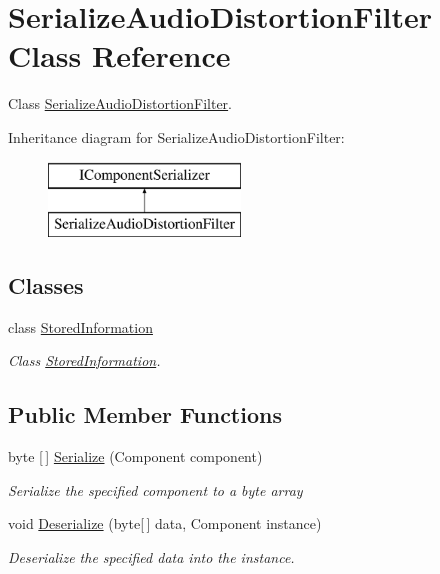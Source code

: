 \hypertarget{class_serialize_audio_distortion_filter}{}\section{Serialize\+Audio\+Distortion\+Filter Class Reference}
\label{class_serialize_audio_distortion_filter}


Class \hyperlink{class_serialize_audio_distortion_filter}{Serialize\+Audio\+Distortion\+Filter}.  


Inheritance diagram for Serialize\+Audio\+Distortion\+Filter\+:\begin{figure}[H]
\begin{center}
\leavevmode
\includegraphics[height=2.000000cm]{class_serialize_audio_distortion_filter}
\end{center}
\end{figure}
\subsection*{Classes}
\begin{DoxyCompactItemize}
\item 
class \hyperlink{class_serialize_audio_distortion_filter_1_1_stored_information}{Stored\+Information}
\begin{DoxyCompactList}\small\item\em Class \hyperlink{class_serialize_audio_distortion_filter_1_1_stored_information}{Stored\+Information}. \end{DoxyCompactList}\end{DoxyCompactItemize}
\subsection*{Public Member Functions}
\begin{DoxyCompactItemize}
\item 
byte \mbox{[}$\,$\mbox{]} \hyperlink{class_serialize_audio_distortion_filter_a035cc0e02b72b00fdc39d0fbfe5c2b96}{Serialize} (Component component)
\begin{DoxyCompactList}\small\item\em Serialize the specified component to a byte array \end{DoxyCompactList}\item 
void \hyperlink{class_serialize_audio_distortion_filter_ac48265d0fbc0547e5d316f09828ca086}{Deserialize} (byte\mbox{[}$\,$\mbox{]} data, Component instance)
\begin{DoxyCompactList}\small\item\em Deserialize the specified data into the instance. \end{DoxyCompactList}\end{DoxyCompactItemize}


